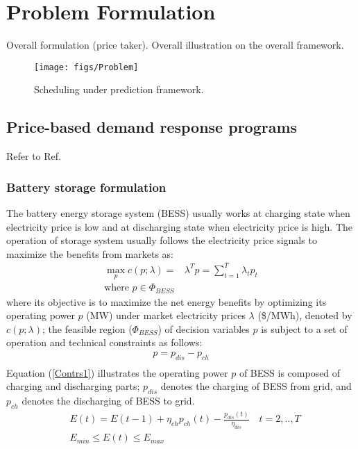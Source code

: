 \documentclass[journal]{IEEEtran}
\newcommand{\slw}{\color{blue}}
\begin{document}
\section{Problem Formulation}
Overall formulation (price taker). {\slw Overall illustration on the overall framework.}

\begin{figure}[ht]
  \centering
  \texttt{[image: figs/Problem]}
  \caption{Scheduling under prediction framework.}
  \label{Problemform}
\end{figure}

\subsection{Price-based demand response programs}
{\slw Refer to Ref. \cite{Chitsaz2018}}
\subsubsection{Battery storage formulation}
The battery energy storage system (BESS) usually works at charging state when electricity price is low and at discharging state when electricity price is high. The operation of storage system usually follows the electricity price signals to maximize the benefits from markets as:
\begin{equation}
  \label{ESbigM}
  \begin{aligned}
    \max_{p} c(p; \lambda) = &\lambda^T p = \sum_{t=1}^T \lambda_t p_t \\
    \text{where }  p \in \Phi_{BESS}
  \end{aligned}
\end{equation}
where its objective is to maximize the net energy benefits by optimizing its operating power $p$ (MW) under market electricity prices $\lambda$ (\$/MWh), denoted by $c(p; \lambda)$; the feasible region ($\Phi_{BESS}$) of decision variables $p$ is subject to a set of operation and technical constraints as follows:
\begin{equation}
  \label{Contrs1}
  \begin{aligned}
    p = p_{dis} - p_{ch} \\
  \end{aligned}
\end{equation}
Equation (\ref{Contrs1}) illustrates the operating power $p$ of BESS is composed of charging and discharging parts; $p_{dis}$ denotes the charging of BESS from grid, and $p_{ch}$ denotes the discharging of BESS to grid.
\begin{equation}
  \label{Contrs2}
  \begin{aligned}
    &E(t) = E(t-1) + \eta_{ch} p_{ch}(t) - \frac{p_{dis}(t)}{\eta_{dis}} \quad t=2,..,T\\
    &E_{min} \leq E(t) \leq E_{max} \\
  \end{aligned}
\end{equation}
\end{document}
